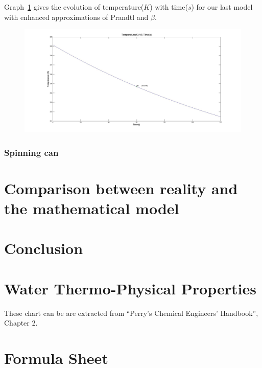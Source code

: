 \documentclass{report}
\begin{document}
	
	Graph~\ref{NSg} gives the evolution of temperature($K$) with time($s$) for our last model with enhanced approximations of Prandtl and $\beta$.
	\begin{figure}
		\label{NSg}
		\centering
		\includegraphics[width=\textwidth]{img/NSg.jpg}
	\end{figure}
	
	
	
	\subsection{Spinning can}
	
	\chapter[Reality and mathematical model]{Comparison between reality and the mathematical model}\label{rvmm}
	
	\chapter{Conclusion}\label{ccl}
	
	
	\appendix
	
	\chapter{Water Thermo-Physical Properties}\label{WTPP}
	
	These chart can be are extracted from ``Perry’s	Chemical Engineers’ Handbook'', Chapter 2\cite{properties}.
	
	
	
	\chapter{Formula Sheet}\label{FORMU}
	
\end{document}
